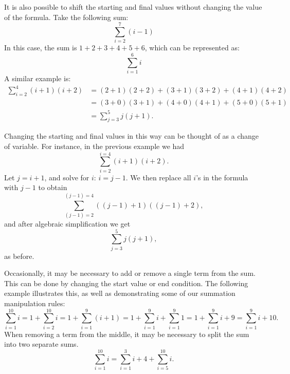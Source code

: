 It is also possible to shift 
the starting and final values without changing the value of the formula. Take the following sum:
\[\sum_{i=2}^{7}(i-1)\] 
In this case, the sum is
$1+2+3+4+5+6$, which can be represented as:
\[\sum_{i=1}^{6}i\] 
A similar example is:
\begin{align*}
\sum_{i=2}^{4}(i+1)(i+2)&=(2+1)(2+2) + (3+1)(3+2)+(4+1)(4+2) \\
 &=(3+0)(3+1) + (4+0)(4+1)+(5+0)(5+1) \\
&= \sum_{j=3}^{5}j(j+1).
\end{align*}
 
Changing the starting and final values in this way can be thought of as a change of variable. For instance, in the previous example we had
\[\sum_{i=2}^{i=4}(i+1)(i+2).\]
Let $j = i+1$, and solve for $i$: $i = j-1$. We then replace all $i$'s in the formula with $j-1$ to obtain
\[\sum_{(j-1)=2}^{(j-1)=4}((j-1)+1)((j-1)+2),\]
and after algebraic simplification we get
\[\sum_{j=3}^{5}j(j+1),\]
as before.

Occasionally, it may be necessary to add or remove a single term from the sum.  This can be done by changing the start value or end condition. The following example illustrates this, as well as demonstrating some of our summation manipulation rules:
\[\sum_{i=1}^{10}i = 1 + \sum_{i=2}^{10} i = 1+ \sum_{i=1}^9 ( i+1) = 1 +  \sum_{i=1}^9  i +  \sum_{i=1}^9  1 = 1+ \sum_{i=1}^9  i + 9 =  \sum_{i=1}^9  i + 10.\]
When removing a term from the middle, it may be necessary to split the sum into two separate sums.
\[\sum_{i=1}^{10}i = \sum_{i=1}^{3}i + 4 + \sum_{i=5}^{10}i.\]

